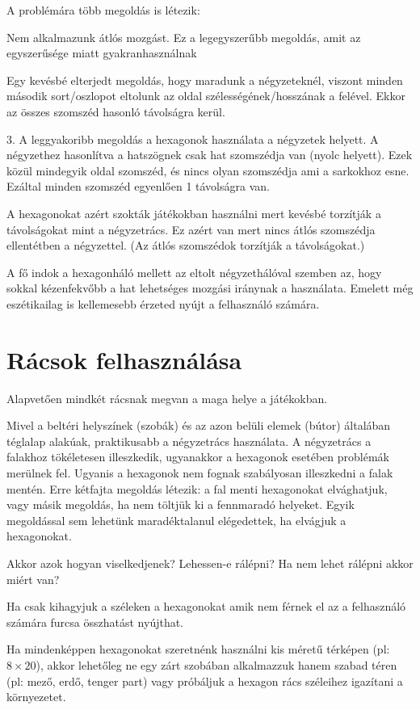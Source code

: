 A problémára több megoldás is létezik:

Nem alkalmazunk átlós mozgást. Ez a legegyszerűbb megoldás, amit az egyszerűsége miatt gyakranhasználnak

Egy kevésbé elterjedt megoldás, hogy maradunk a négyzeteknél, viszont minden második sort/oszlopot eltolunk az oldal szélességének/hosszának a felével. Ekkor az összes szomszéd hasonló távolságra kerül.

3. A leggyakoribb megoldás a hexagonok használata a négyzetek helyett. A négyzethez hasonlítva a hatszögnek csak hat szomszédja van (nyolc helyett). Ezek közül mindegyik oldal szomszéd, és nincs olyan szomszédja ami a sarkokhoz esne. Ezáltal minden szomszéd egyenlően 1 távolságra van.

A hexagonokat azért szokták játékokban használni mert kevésbé torzítják a távolságokat mint a négyzetrács. Ez azért van mert nincs átlós szomszédja ellentétben a négyzettel. (Az átlós szomszédok torzítják a távolságokat.)

A fő indok a hexagonháló mellett az eltolt négyzethálóval szemben az, hogy sokkal kézenfekvőbb a hat lehetséges mozgási iránynak a használata. Emelett még eszétikailag is kellemesebb érzeted nyújt a felhasználó számára.

\section{Rácsok felhasználása}

Alapvetően mindkét rácsnak megvan a maga helye a játékokban. 

Mivel a beltéri helyszínek (szobák) és az azon belüli elemek (bútor) általában téglalap alakúak, praktikusabb a négyzetrács használata. A négyzetrács a falakhoz tökéletesen illeszkedik, ugyanakkor a hexagonok esetében problémák merülnek fel. Ugyanis a hexagonok nem fognak szabályosan illeszkedni a falak mentén. Erre kétfajta megoldás létezik: a fal menti hexagonokat elvághatjuk, vagy másik megoldás, ha nem töltjük ki a fennmaradó helyeket. Egyik megoldással sem lehetünk maradéktalanul elégedettek, ha elvágjuk a hexagonokat. 

Akkor azok hogyan viselkedjenek? 
Lehessen-e rálépni?
Ha nem lehet rálépni akkor miért van?

Ha csak kihagyjuk a széleken a hexagonokat amik nem férnek el az a felhasználó számára furcsa összhatást nyújthat.

Ha mindenképpen hexagonokat  szeretnénk használni kis méretű térképen (pl: $8 \times 20$), akkor lehetőleg ne egy zárt szobában alkalmazzuk hanem szabad téren (pl: mező, erdő, tenger part) vagy próbáljuk a hexagon rács széleihez igazítani a környezetet.

